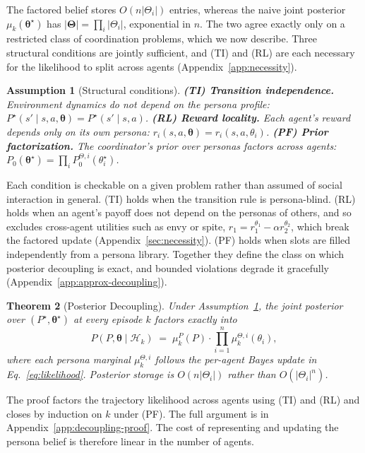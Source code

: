 \documentclass[letterpaper]{article} %
\newtheorem{theorem}{Theorem}[section]
\newtheorem{assumption}[theorem]{Assumption}
\begin{document}
The factored belief stores $O(n|\Theta_i|)$ entries, whereas the naive joint posterior $\mu_k(\boldsymbol\theta^\star)$ has $|\boldsymbol\Theta| = \prod_i |\Theta_i|$, exponential in $n$. The two agree exactly only on a restricted class of coordination problems, which we now describe. Three structural conditions are jointly sufficient, and (TI) and (RL) are each necessary for the likelihood to split across agents (Appendix~\ref{app:necessity}).

\begin{assumption}[Structural conditions]
\label{ass:struct}
\textbf{(TI) Transition independence.} Environment dynamics do not depend on the persona profile: $P^\star(s' \mid s, a, \boldsymbol\theta) = P^\star(s' \mid s, a)$.
\textbf{(RL) Reward locality.} Each agent's reward depends only on its own persona: $r_i(s, a, \boldsymbol\theta) = r_i(s, a, \theta_i)$.
\textbf{(PF) Prior factorization.} The coordinator's prior over personas factors across agents: $P_0(\boldsymbol\theta^\star) = \prod_i P_0^{\Theta,i}(\theta_i^\star)$.
\end{assumption}

Each condition is checkable on a given problem rather than assumed of social interaction in general. (TI) holds when the transition rule is persona-blind. (RL) holds when an agent's payoff does not depend on the personas of others, and so excludes cross-agent utilities such as envy or spite, $r_1 = r_1^{\theta_1} - \alpha r_2^{\theta_2}$, which break the factored update (Appendix~\ref{sec:necessity}). (PF) holds when slots are filled independently from a persona library. Together they define the class on which posterior decoupling is exact, and bounded violations degrade it gracefully (Appendix~\ref{app:approx-decoupling}).

\begin{theorem}[Posterior Decoupling]
\label{thm:decoupling-main}
Under Assumption~\ref{ass:struct}, the joint posterior over $(P^\star, \boldsymbol\theta^\star)$ at every episode $k$ factors exactly into
\[
P(P, \boldsymbol\theta \mid \mathcal{H}_k) \;=\; \mu_k^P(P) \cdot \prod_{i=1}^n \mu_k^{\Theta,i}(\theta_i),
\]
where each persona marginal $\mu_k^{\Theta,i}$ follows the per-agent Bayes update in Eq.~\eqref{eq:likelihood}. Posterior storage is $O(n|\Theta_i|)$ rather than $O(|\Theta_i|^n)$.
\end{theorem}

The proof factors the trajectory likelihood across agents using (TI) and (RL) and closes by induction on $k$ under (PF). The full argument is in Appendix~\ref{app:decoupling-proof}. The cost of representing and updating the persona belief is therefore linear in the number of agents.
\end{document}
